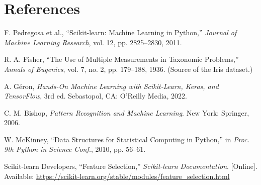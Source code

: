 \documentclass[11pt,a4paper]{article}
\begin{document}
\section{References}
\begin{enumerate}[label={[\arabic*]}]
\item F. Pedregosa et al., ``Scikit-learn: Machine Learning in Python,'' \emph{Journal of Machine Learning Research}, vol. 12, pp. 2825--2830, 2011.
\item R. A. Fisher, ``The Use of Multiple Measurements in Taxonomic Problems,'' \emph{Annals of Eugenics}, vol. 7, no. 2, pp. 179--188, 1936. (Source of the Iris dataset.)
\item A. G\'eron, \emph{Hands-On Machine Learning with Scikit-Learn, Keras, and TensorFlow}, 3rd ed. Sebastopol, CA: O'Reilly Media, 2022.
\item C. M. Bishop, \emph{Pattern Recognition and Machine Learning}. New York: Springer, 2006.
\item W. McKinney, ``Data Structures for Statistical Computing in Python,'' in \emph{Proc. 9th Python in Science Conf.}, 2010, pp. 56--61.
\item Scikit-learn Developers, ``Feature Selection,'' \emph{Scikit-learn Documentation}. [Online]. Available: \url{https://scikit-learn.org/stable/modules/feature_selection.html}
\end{enumerate}
\end{document}
